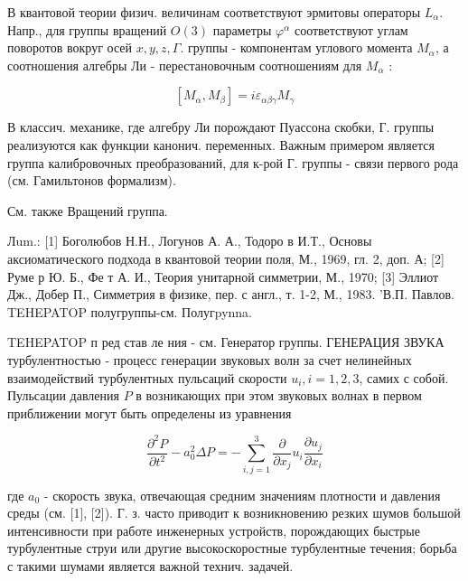 \documentclass[10pt]{article}
\begin{document}
В квантовой теории физич. величинам соответствуют эрмитовы операторы $L_{\alpha}$. Напр., для группы вращений $O(3)$ параметры $\varphi^{\alpha}$ соответствуют углам поворотов вокруг осей $x, y, z, \Gamma$. группы - компонентам углового момента $M_{\alpha}$, а соотношения алгебры Ли - перестановочным соотношениям для $M_{\alpha}$ :



\[

\left[M_{\alpha}, M_{\beta}\right]=i \varepsilon_{\alpha \beta \gamma} M_{\gamma}

\]



В классич. механике, где алгебру Ли порождают Пуассона скобки, Г. группы реализуются как функции канонич. переменных. Важным примером является группа калибровочных преобразований, для к-рой Г. группы - связи первого рода (см. Гамильтонов формализм).



См. также Вращений группа.



Лum.: [1] Боголюбов Н.Н., Логунов А. А., Тодоро в И.Т., Основы аксиоматического подхода в квантовой теории поля, М., 1969, гл. 2, доп. А; [2] Руме р Ю. Б., Фе т А. И., Теория унитарной симметрии, М., 1970; [3] Эллиот Дж., Добер П., Симметрия в физике, пер. с англ., т. 1-2, М., 1983. 'В.П. Павлов. TEHEPATOP полугруппы-см. Полугpynna.



TEHEPATOP п ред став ле ния - см. Генератор группы. ГЕНЕРАЦИЯ ЗВУКА турбулентностью - процесс генерации звуковых волн за счет нелинейных взаимодействий турбулентных пульсаций скорости $u_{i}, i=1,2,3$, самих с собой. Пульсации давления $P$ в возникающих при этом звуковых волнах в первом приближении могут быть определены из уравнения



\[

\frac{\partial^{2} P}{\partial t^{2}}-a_{0}^{2} \Delta P=-\sum_{i, j=1}^{3} \frac{\partial}{\partial x_{j}} u_{i} \frac{\partial u_{j}}{\partial x_{i}}

\]



где $a_{0}$ - скорость звука, отвечающая средним значениям плотности и давления среды (см. [1], [2]). Г. з. часто приводит к возникновению резких шумов большой интенсивности при работе инженерных устройств, порождающих быстрые турбулентные струи или другие высокоскоростные турбулентные течения; борьба с такими шумами является важной технич. задачей.
\end{document}
